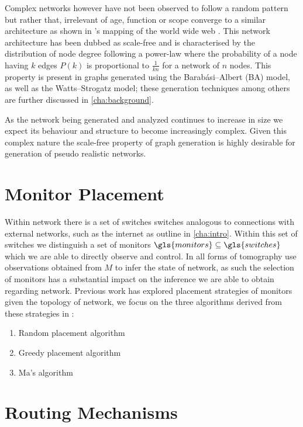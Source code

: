Complex networks however have not been observed to follow a random pattern but rather that, irrelevant of age, function or scope converge to a similar architecture as shown in \cite{albert_diameter_1999}’s mapping of the world wide web . This network architecture has been dubbed as scale-free and is characterised by the distribution of node degree following a power-law where the probability of a node having $k$ edges $P(k)$  is proportional to $\frac{1}{kn}$ for a network of $n$ nodes. This property is present in graphs generated using the Barabási–Albert (BA) model, as well as the Watts–Strogatz model; these generation techniques among others are further discussed in \cref{cha:background}.\par
As the network being generated and analyzed continues to increase in size we expect its behaviour and structure to become increasingly complex. Given this complex nature the scale-free property of graph generation is highly desirable for generation of pseudo realistic networks.

\section{Monitor Placement}
\label{sec:Bmonitorplacement}
Within \gls{network} there is a set of switches \gls{switches} analogous to connections with external networks, such as the internet as outline in \cref{cha:intro}. Within this set of switches we distinguish a set of monitors $\gls{monitors}\subseteq \gls{switches}$ which we are able to directly observe and control. In all forms of tomography use observations obtained from $M$ to infer the state of \gls{network}, as such the selection of \gls{monitors} has a substantial impact on the inference we are able to obtain regarding \gls{network}. Previous work has explored placement strategies of \gls{monitors} given the topology of \gls{network}, we focus on the three algorithms derived from these strategies in \cite{ma_optimal_2015}:
\begin{enumerate}
    \item Random placement algorithm
    \item Greedy placement algorithm
    \item Ma's algorithm
\end{enumerate}


\section{Routing Mechanisms}
\label{sec:Broutingmechanisms}


